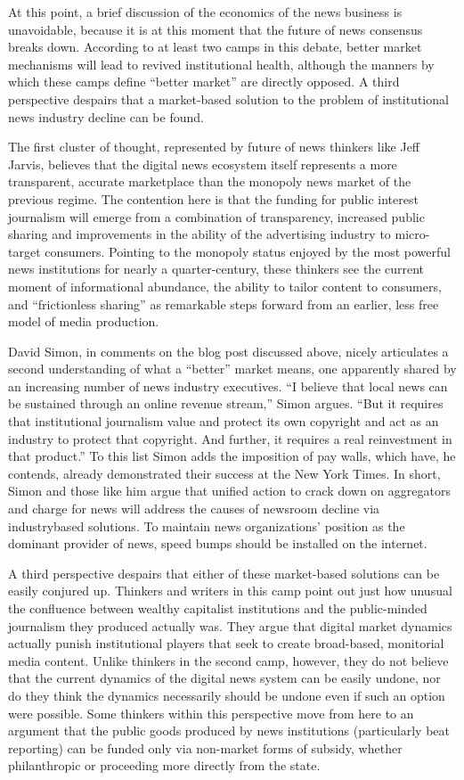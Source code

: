 At this point, a brief discussion of the economics of the news business is unavoidable,
because it is at this moment that the future of news consensus breaks down.
According to at least two camps in this debate, better market mechanisms will
lead to revived institutional health, although the manners by which these camps
define ``better market'' are directly opposed. A third perspective despairs that a
market-based solution to the problem of institutional news industry decline can
be found.

The first cluster of thought, represented by future of news thinkers like Jeff Jarvis,
believes that the digital news ecosystem itself represents a more transparent, accurate
marketplace than the monopoly news market of the previous regime. The
contention here is that the funding for public interest journalism will emerge
from a combination of transparency, increased public sharing and improvements in the ability of the advertising industry to micro-target consumers. Pointing to
the monopoly status enjoyed by the most powerful news institutions for nearly a
quarter-century, these thinkers see the current moment of informational abundance,
the ability to tailor content to consumers, and ``frictionless sharing'' as
remarkable steps forward from an earlier, less free model of media production.

David Simon, in comments on the blog post discussed above, nicely articulates a
second understanding of what a ``better'' market means, one apparently shared by
an increasing number of news industry executives. ``I believe that local news can
be sustained through an online revenue stream,'' Simon argues. ``But it requires
that institutional journalism value and protect its own copyright and act as an
industry to protect that copyright. And further, it requires a real reinvestment in
that product.'' To this list Simon adds the imposition of pay walls, which have, he
contends, already demonstrated their success at the New York Times. In short,
Simon and those like him argue that unified action to crack down on aggregators
and charge for news will address the causes of newsroom decline via industrybased
solutions. To maintain news organizations’ position as the dominant provider
of news, speed bumps should be installed on the internet.

A third perspective despairs that either of these market-based solutions can be
easily conjured up. Thinkers and writers in this camp point out just how unusual
the confluence between wealthy capitalist institutions and the public-minded
journalism they produced actually was. They argue that digital market dynamics
actually punish institutional players that seek to create broad-based, monitorial
media content. Unlike thinkers in the second camp, however, they do not believe
that the current dynamics of the digital news system can be easily undone, nor
do they think the dynamics necessarily should be undone even if such an option
were possible. Some thinkers within this perspective move from here to an argument
that the public goods produced by news institutions (particularly beat
reporting) can be funded only via non-market forms of subsidy, whether philanthropic
or proceeding more directly from the state.

